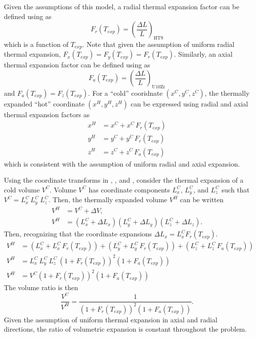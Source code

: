   Given the assumptions of this model, a radial thermal expansion factor can be
  defined using  as
  \begin{equation}
    \label{eq:lef_r}
    F_r(T_{exp}) = \left(\frac{\Delta L}{L}\right)_{\text{HT9}}
  \end{equation}
  which is a function of $T_{exp}$. Note that given the assumption of uniform
  radial thermal expansion, ${F_x(T_{exp}) = F_y(T_{exp}) = F_r(T_{exp})}$.
  Similarly, an axial thermal expansion factor can be defined using
   as 
  \begin{equation}
    \label{eq:lef_a}
    F_a(T_{exp}) = \left(\frac{\Delta L}{L}\right)_{\text{U10Zr}}
  \end{equation}
  and $F_a(T_{exp}) = F_z(T_{exp})$. For a ``cold'' cooridnate $(x^C,y^C,z^C)$,
  the thermally expanded ``hot'' coordinate $(x^H,y^H,z^H)$ can be expressed 
  using radial and axial thermal expansion factors as
  \begin{align}
    \label{eq:expand_x}
    x^H &= x^C + x^C \, F_r(T_{exp}) \\
    \label{eq:expand_y}
    y^H &= y^C + y^C \, F_r(T_{exp}) \\
    \label{eq:expand_z}
    z^H &= z^C + z^C \, F_a(T_{exp})
  \end{align}
  which is consistent with the assumption of uniform radial and axial expansion.

  Using the coordinate transforms in , , and
  , consider the thermal expansion of a cold volume $V^C$.
  Volume $V^C$ has coordinate components $L_x^C$, $L_y^C$, and $L_z^C$ such that 
  ${V^C = L_x^C \, L_y^C \, L_z^C}$. Then, the thermally expanded volume $V^H$ 
  can be written
  \begin{align}
    V^H &= V^C + \Delta V, \\
    V^H &= (L_x^C + \Delta L_x) (L_y^C + \Delta L_y) (L_z^C + \Delta L_z). 
  \end{align}
  Then, recognizing that the coordinate expansions 
  ${\Delta L_x = L_x^C F_r(T_{exp})}$.
  \begin{align}
    V^H &= (L_x^C + L_x^C \, F_r(T_{exp})) + (L_y^C + L_y^C \, F_r(T_{exp})) + 
      (L_z^C + L_z^C \, F_a(T_{exp})) \\
    V^H &= L_x^C \, L_y^C \, L_z^C \, (1 + F_r(T_{exp}))^2 (1+F_a(T_{exp})) \\
    V^H &= V^C (1 + F_r(T_{exp}))^2 (1+F_a(T_{exp}))
  \end{align}
  The volume ratio is then
  \begin{equation}
    \label{eq:volume_ratio}
    \frac{V^C}{V^H} = \frac{1}{(1+F_r(T_{exp}))^2 (1+F_a(T_{exp}))}.
  \end{equation}
  Given the assumption of uniform thermal expansion in axial and radial
  directions, the ratio of volumetric expansion is constant throughout the
  problem.

